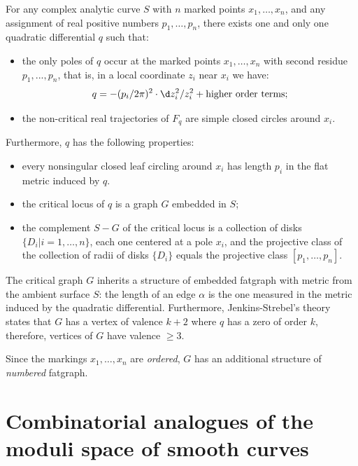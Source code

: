 \begin{theorem} 
  \label{thm:JS}
  For any complex analytic curve $S$ with $n$ marked points $x_1, \ldots,
  x_n$, and any assignment of real positive numbers $p_1, \ldots, p_n$,
  there exists one and only one quadratic differential $q$ such that:
  \begin{itemize}
  \item the only poles of $q$ occur at the marked points $x_1, \ldots, x_n$
    with second residue $p_1, ..., p_n$, that is, in a local
    coordinate $z_i$ near $x_i$ we have:
    \begin{equation*}
      q = -(p_i/2\pi)^2 \cdot \d z_i^2 / z_i^2 + \text{higher order terms};
    \end{equation*}
  \item the non-critical real trajectories of $F_q$ are simple closed
    circles around $x_i$.
  \end{itemize}
  Furthermore, $q$ has the following properties:
  \begin{itemize}
  \item every nonsingular closed leaf circling around $x_i$ has length
    $p_i$ in the flat metric induced by $q$.
  \item the critical locus of $q$ is a graph $G$ embedded in $S$;
  \item the complement $S - G$ of the critical locus is a collection
    of disks $\{D_i | i=1,\ldots,n\}$, each one centered at a pole $x_i$, and
    the projective class of the collection of radii of disks $\{D_i\}$
    equals the projective class $[p_1, \ldots, p_n]$.
  \end{itemize}
\end{theorem}
The critical graph $G$ inherits a structure of embedded fatgraph
with metric from the ambient surface $S$: the length of an edge $\alpha$ is
the one measured in the metric induced by the quadratic differential.
Furthermore, Jenkins-Strebel's theory states that $G$ has a vertex of
valence $k+2$ where $q$ has a zero of order $k$, therefore, vertices
of $G$ have valence $\geq3$. 

Since the markings $x_1, \ldots, x_n$ are \emph{ordered}, $G$ has an
additional structure of \emph{numbered} fatgraph.



\section{Combinatorial analogues of the moduli space of smooth curves}
\label{sec:mgn-comb}

